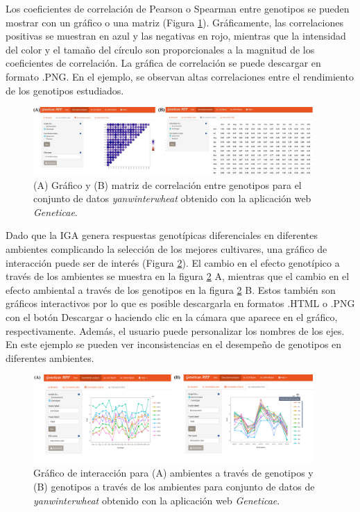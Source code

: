 Los coeficientes de correlación de Pearson o Spearman entre genotipos se pueden mostrar con un gráfico o una matriz (Figura \ref{fig:figdesc2}). Gráficamente, las correlaciones positivas se muestran en azul y las negativas en rojo, mientras que la intensidad del color y el tamaño del círculo son proporcionales a la magnitud de los coeficientes de correlación. La gráfica de correlación se puede descargar en formato .PNG. En el ejemplo, se observan altas correlaciones entre el rendimiento de los genotipos estudiados. 

\begin{figure}[h]
	\begin{center}
		\includegraphics[width=0.95\textwidth]{./Graficos/www/correlacion.png}
	\end{center}
	\caption{(A) Gráfico y (B) matriz de correlación entre genotipos para el conjunto de datos \emph{yanwinterwheat} obtenido con la aplicación web \emph{Geneticae}.}
	\label{fig:figdesc2}
\end{figure}


Dado que la IGA genera respuestas genotípicas diferenciales en diferentes ambientes complicando la selección de los mejores cultivares, una gráfico de interacción puede ser de interés (Figura \ref{fig:figdesc3}). El cambio en el efecto genotípico a través de los ambientes se muestra en la figura \ref{fig:figdesc3} A, mientras que el cambio en el efecto ambiental a través de los genotipos en la figura \ref{fig:figdesc3} B. Estos también son gráficos interactivos por lo que es posible descargarla en formatos .HTML o .PNG con el botón Descargar o haciendo clic en la cámara que aparece en el gráfico, respectivamente. Además, el usuario puede personalizar los nombres de los ejes. En este ejemplo se pueden ver inconsistencias en el desempeño de genotipos en diferentes ambientes. 


\begin{figure}[h]
	\begin{center}
		\includegraphics[width=0.95\textwidth]{./Graficos/www/interaction.png}
	\end{center}
	\caption{Gráfico de interacción para (A) ambientes a través de genotipos y (B) genotipos a través de los ambientes para conjunto de datos de \emph{yanwinterwheat} obtenido con la aplicación web \emph{Geneticae}.}
	\label{fig:figdesc3}
\end{figure}


